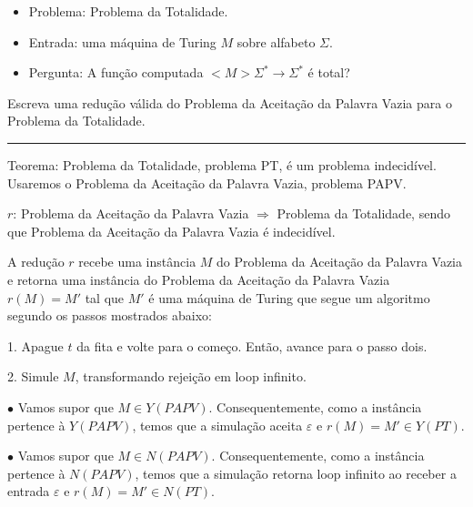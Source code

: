 \documentclass{article}
\begin{document}
\medskip

\begin{itemize}

    \item Problema: Problema da Totalidade.
    \item Entrada: uma máquina de Turing $M$ sobre alfabeto $\Sigma$.
    \item Pergunta: A função computada $< M > \Sigma ^* \to \Sigma ^*$ é total?
    
\end{itemize}

\medskip

Escreva uma redução válida do Problema da Aceitação da Palavra Vazia para o Problema da Totalidade.

\bigskip

\noindent\rule{\textwidth}{0.5pt}

\bigskip

Teorema: Problema da Totalidade, problema PT, é um problema indecidível. Usaremos o Problema da Aceitação da Palavra Vazia, problema PAPV.

\medskip

$r$: Problema da Aceitação da Palavra Vazia $\Longrightarrow$  Problema da Totalidade, sendo que Problema da Aceitação da Palavra Vazia é indecidível.

\medskip

A redução $r$ recebe uma instância $M$ do Problema da Aceitação da Palavra Vazia e retorna uma instância do Problema da Aceitação da Palavra Vazia $r(M) = M'$ tal que $M'$ é uma máquina de Turing que segue um algoritmo segundo os passos mostrados abaixo:

\smallskip

1. Apague $t$ da fita e volte para o começo. Então, avance para o passo dois.

\smallskip

2. Simule $M$, transformando rejeição em loop infinito.

\medskip

$\bullet$ Vamos supor que $M \in Y(PAPV)$. Consequentemente, como a instância pertence à $Y(PAPV)$, temos que a simulação aceita $\varepsilon$ e $r(M) = M' \in Y(PT)$.

\smallskip

$\bullet$ Vamos supor que $M \in N(PAPV)$. Consequentemente, como a instância pertence à $N(PAPV)$, temos que a simulação retorna loop infinito ao receber a entrada $\varepsilon$ e $r(M) = M' \in N(PT)$.
\end{document}

